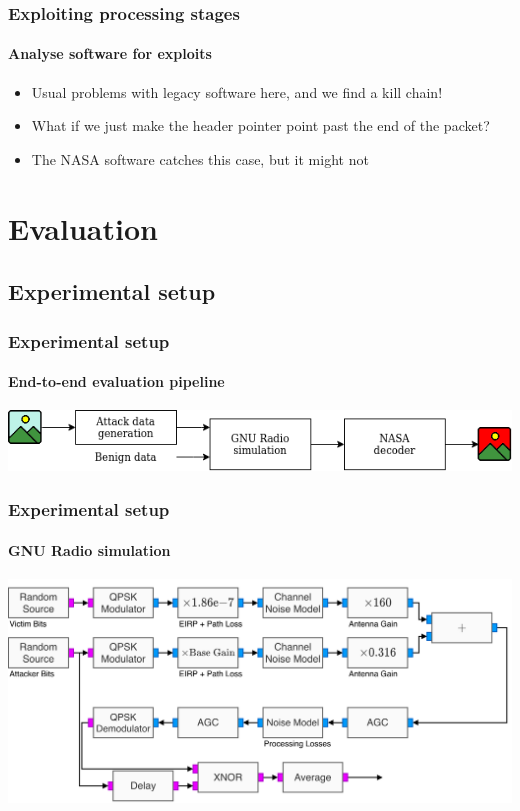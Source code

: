 \documentclass{beamer}
\begin{document}

\begin{frame}
  \frametitle{Exploiting processing stages}
  \framesubtitle{Analyse software for exploits}

  \begin{itemize}
    \item Usual problems with legacy software here, and we find a kill chain!
    \item What if we just make the header pointer point past the end of the packet?
    \item The NASA software catches this case, but it might not
  \end{itemize}
\end{frame}


\section{Evaluation}
\subsection{Experimental setup}

\begin{frame}
  \frametitle{Experimental setup}
  \framesubtitle{End-to-end evaluation pipeline}
  \includegraphics[width=\textwidth]{images/overall_simulation.png}
\end{frame}

\begin{frame}
  \frametitle{Experimental setup}
  \framesubtitle{GNU Radio simulation}
  \includegraphics[width=\textwidth]{images/overshadowing_pipeline.pdf}
\end{frame}
\end{document}
